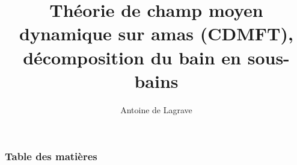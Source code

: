 \documentclass{beamer}
\title[Théorie de champ moyen dynamique sur amas (CDMFT), décomposition du bain en sous-bains]
{Théorie de champ moyen dynamique sur amas (CDMFT), décomposition du bain en sous-bains}
\author{Antoine de Lagrave}
\institute[]{
    Sommaire projet de maîtrise \\
    Département de physique \\
    \today
}
\date[\today]
\begin{document}

    \frame{\titlepage}

    

    \begin{frame}
        \frametitle{Table des matières}
        \tableofcontents
    \end{frame}

    

    

    
\end{document}
